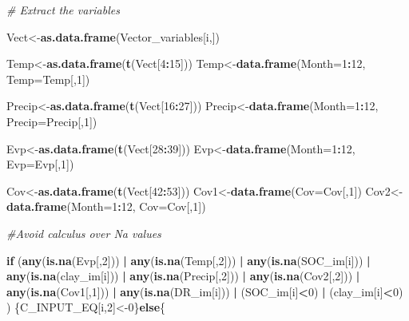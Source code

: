 \documentclass[
  10pt,
  b5paper,
]{book}
\newenvironment{Shaded}{\begin{snugshade}}{\end{snugshade}}
\newcommand{\CommentTok}[1]{\textcolor[rgb]{0.56,0.35,0.01}{\textit{#1}}}
\newcommand{\ControlFlowTok}[1]{\textcolor[rgb]{0.13,0.29,0.53}{\textbf{#1}}}
\newcommand{\DataTypeTok}[1]{\textcolor[rgb]{0.13,0.29,0.53}{#1}}
\newcommand{\DecValTok}[1]{\textcolor[rgb]{0.00,0.00,0.81}{#1}}
\newcommand{\KeywordTok}[1]{\textcolor[rgb]{0.13,0.29,0.53}{\textbf{#1}}}
\newcommand{\NormalTok}[1]{#1}
\newcommand{\OperatorTok}[1]{\textcolor[rgb]{0.81,0.36,0.00}{\textbf{#1}}}
\newcommand{\StringTok}[1]{\textcolor[rgb]{0.31,0.60,0.02}{#1}}
\begin{document}
\begin{Shaded}
\begin{Highlighting}[]
\CommentTok{# Extract the variables }

\NormalTok{Vect<-}\KeywordTok{as.data.frame}\NormalTok{(Vector_variables[i,])}

\NormalTok{Temp<-}\KeywordTok{as.data.frame}\NormalTok{(}\KeywordTok{t}\NormalTok{(Vect[}\DecValTok{4}\OperatorTok{:}\DecValTok{15}\NormalTok{]))}
\NormalTok{Temp<-}\KeywordTok{data.frame}\NormalTok{(}\DataTypeTok{Month=}\DecValTok{1}\OperatorTok{:}\DecValTok{12}\NormalTok{, }\DataTypeTok{Temp=}\NormalTok{Temp[,}\DecValTok{1}\NormalTok{])}

\NormalTok{Precip<-}\KeywordTok{as.data.frame}\NormalTok{(}\KeywordTok{t}\NormalTok{(Vect[}\DecValTok{16}\OperatorTok{:}\DecValTok{27}\NormalTok{]))}
\NormalTok{Precip<-}\KeywordTok{data.frame}\NormalTok{(}\DataTypeTok{Month=}\DecValTok{1}\OperatorTok{:}\DecValTok{12}\NormalTok{, }\DataTypeTok{Precip=}\NormalTok{Precip[,}\DecValTok{1}\NormalTok{])}

\NormalTok{Evp<-}\KeywordTok{as.data.frame}\NormalTok{(}\KeywordTok{t}\NormalTok{(Vect[}\DecValTok{28}\OperatorTok{:}\DecValTok{39}\NormalTok{]))}
\NormalTok{Evp<-}\KeywordTok{data.frame}\NormalTok{(}\DataTypeTok{Month=}\DecValTok{1}\OperatorTok{:}\DecValTok{12}\NormalTok{, }\DataTypeTok{Evp=}\NormalTok{Evp[,}\DecValTok{1}\NormalTok{])}
	
\NormalTok{Cov<-}\KeywordTok{as.data.frame}\NormalTok{(}\KeywordTok{t}\NormalTok{(Vect[}\DecValTok{42}\OperatorTok{:}\DecValTok{53}\NormalTok{]))}
\NormalTok{Cov1<-}\KeywordTok{data.frame}\NormalTok{(}\DataTypeTok{Cov=}\NormalTok{Cov[,}\DecValTok{1}\NormalTok{])}
\NormalTok{Cov2<-}\KeywordTok{data.frame}\NormalTok{(}\DataTypeTok{Month=}\DecValTok{1}\OperatorTok{:}\DecValTok{12}\NormalTok{, }\DataTypeTok{Cov=}\NormalTok{Cov[,}\DecValTok{1}\NormalTok{])}

\CommentTok{#Avoid calculus over Na values }

\ControlFlowTok{if}\NormalTok{ (}\KeywordTok{any}\NormalTok{(}\KeywordTok{is.na}\NormalTok{(Evp[,}\DecValTok{2}\NormalTok{])) }\OperatorTok{|}\StringTok{ }\KeywordTok{any}\NormalTok{(}\KeywordTok{is.na}\NormalTok{(Temp[,}\DecValTok{2}\NormalTok{])) }\OperatorTok{|}\StringTok{ }\KeywordTok{any}\NormalTok{(}\KeywordTok{is.na}\NormalTok{(SOC_im[i])) }\OperatorTok{|}\StringTok{ }\KeywordTok{any}\NormalTok{(}\KeywordTok{is.na}\NormalTok{(clay_im[i])) }\OperatorTok{|}\StringTok{ }\KeywordTok{any}\NormalTok{(}\KeywordTok{is.na}\NormalTok{(Precip[,}\DecValTok{2}\NormalTok{]))  }\OperatorTok{|}\StringTok{  }\KeywordTok{any}\NormalTok{(}\KeywordTok{is.na}\NormalTok{(Cov2[,}\DecValTok{2}\NormalTok{]))  }\OperatorTok{|}\StringTok{  }\KeywordTok{any}\NormalTok{(}\KeywordTok{is.na}\NormalTok{(Cov1[,}\DecValTok{1}\NormalTok{]))  }\OperatorTok{|}\StringTok{ }\KeywordTok{any}\NormalTok{(}\KeywordTok{is.na}\NormalTok{(DR_im[i])) }\OperatorTok{|}\StringTok{  }\NormalTok{(SOC_im[i]}\OperatorTok{<}\DecValTok{0}\NormalTok{) }\OperatorTok{|}\StringTok{ }\NormalTok{(clay_im[i]}\OperatorTok{<}\DecValTok{0}\NormalTok{) ) \{C_INPUT_EQ[i,}\DecValTok{2}\NormalTok{]<-}\DecValTok{0}\NormalTok{\}}\ControlFlowTok{else}\NormalTok{\{}


\end{Highlighting}
\end{Shaded}
\end{document}
